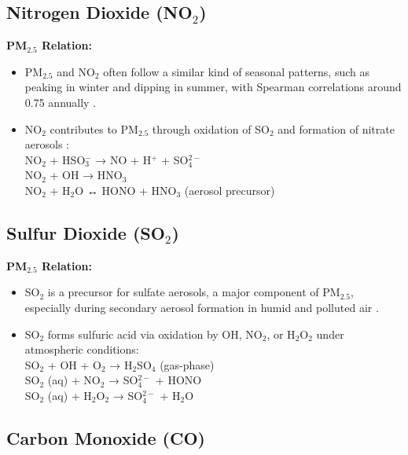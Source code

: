 \documentclass[12pt]{report}
\begin{document}
\subsection*{Nitrogen Dioxide (NO$_2$)}

\noindent\textbf{PM$_{2.5}$ Relation:}

\begin{itemize}
    \item PM$_{2.5}$ and NO$_2$ often follow a similar kind of seasonal patterns, such as peaking in winter and dipping in summer, with Spearman correlations around 0.75 annually \cite{nitrogen1}.
    
    \item NO$_2$ contributes to PM$_{2.5}$ through oxidation of SO$_2$ and formation of nitrate aerosols \cite{nitrogen2}\cite{nitrogen3}: \\
    \quad \quad NO$_2$ + HSO$_3^-$ → NO + H$^+$ + SO$_4^{2-}$ \\
    \quad \quad NO$_2$ + OH → HNO$_3$ \\
    \quad \quad NO$_2$ + H$_2$O ↔ HONO + HNO$_3$ (aerosol precursor) 
\end{itemize}


\subsection*{Sulfur Dioxide (SO$_2$)}

\noindent\textbf{PM$_{2.5}$ Relation:}

\begin{itemize}
    \item SO$_2$ is a precursor for sulfate aerosols, a major component of PM$_{2.5}$, especially during secondary aerosol formation in humid and polluted air \cite{sulphate}.
    
    \item SO$_2$ forms sulfuric acid via oxidation by OH, NO$_2$, or H$_2$O$_2$ under atmospheric conditions: \\
    \quad \quad SO$_2$ + OH + O$_2$ → H$_2$SO$_4$ (gas-phase) \\
    \quad \quad SO$_2$ (aq) + NO$_2$ → SO$_4^{2-}$ + HONO \\
    \quad \quad SO$_2$ (aq) + H$_2$O$_2$ → SO$_4^{2-}$ + H$_2$O
\end{itemize}


\subsection*{Carbon Monoxide (CO)}
\end{document}
